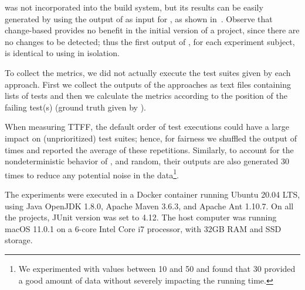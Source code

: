 \fz was not incorporated into the build system, but its results can be easily generated by using the output of \ek as input for \fz, as shown in~.
Observe that change-based \tcs provides no benefit in the initial version of a project, since there are no changes to be detected; thus the first output of \fz, for each experiment subject, is identical to using \fs in isolation.

To collect the metrics, we did not actually execute the test suites given by each approach. First we collect the outputs of the approaches as text files containing lists of tests and then we calculate the metrics according to the position of the failing test(s) (ground truth given by \dfj).

When measuring TTFF, the default order of test executions could have a large impact on (unprioritized) test suites; hence, for fairness we shuffled the output of  times and reported the average of these repetitions.
Similarly, to account for the nondeterministic behavior of \fs, \fz and random, their outputs are also generated 30 times to reduce any potential noise in the data\footnote{We experimented with values between 10 and 50 and found that 30 provided a good amount of data without severely impacting the running time.}.

The experiments were executed in a Docker container running Ubuntu 20.04 LTS, using Java OpenJDK 1.8.0, Apache Maven 3.6.3, and Apache Ant 1.10.7.
On all the projects, JUnit version was set to 4.12.
The host computer was running macOS 11.0.1 on a 6-core Intel Core i7 processor, with 32GB RAM and SSD storage.
